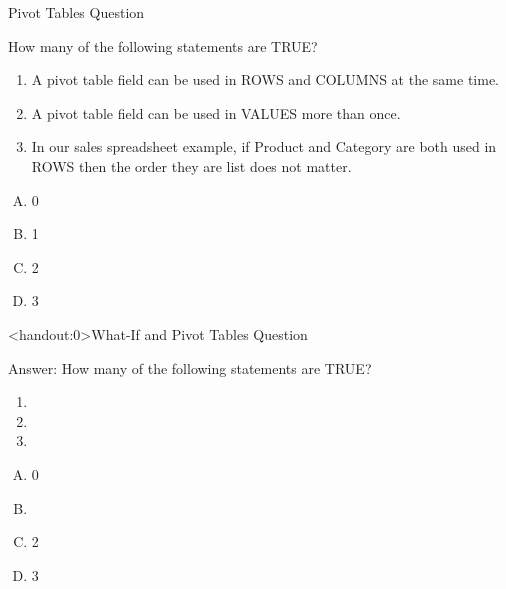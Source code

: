 \documentclass[xcolor=svgnames, handout]{beamer}
\begin{document}
\begin{frame}{Pivot Tables Question}
  \begin{example}
 How many of the following statements are TRUE?
 \begin{enumerate}
\item A pivot table field can be used in ROWS and COLUMNS at the same time.
\item A pivot table field can be used in VALUES more than once.
\item In our sales spreadsheet example, if Product and Category are both used in ROWS then the order they are list does not matter.
 \end{enumerate}
\begin{multicols}{5}
\begin{enumerate}[A)]
\item 0 
\item 1
\item 2
\item 3
\end{enumerate}
\end{multicols}
  \end{example} 
\end{frame}

\begin{frame}<handout:0>{What-If and Pivot Tables Question}
  \begin{block}{Answer:}
 How many of the following statements are TRUE?
 \begin{enumerate}
\item {}
\item {}
\item {}
 \end{enumerate}
\begin{multicols}{5}
\begin{enumerate}[A)]
\item 0 
\item \textbf<4>{\textit<4>{{}}}
\item 2
\item 3
\end{enumerate}
\end{multicols}
  \end{block} 
\end{frame}
\end{document}
